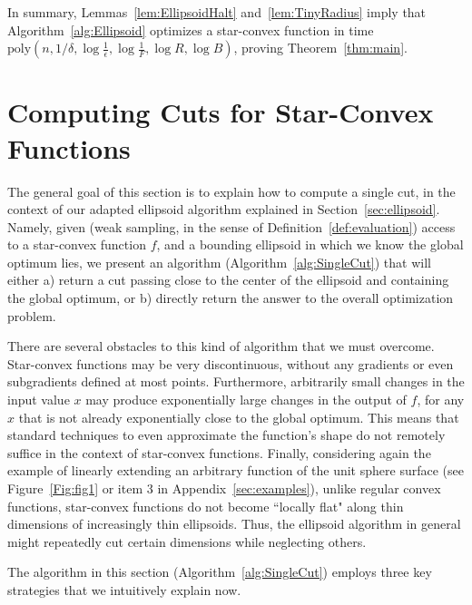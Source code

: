 \documentclass[11pt,letter]{article}
\renewcommand{\poly}{\mathrm{poly}}
\newcommand{\ferr}{\epsilon}
\newcommand{\perr}{\delta}
\numberwithin{nTheorems}{section}
\begin{document}
In summary, Lemmas~\ref{lem:EllipsoidHalt} and~\ref{lem:TinyRadius} imply that Algorithm~\ref{alg:Ellipsoid} optimizes a star-convex function in time $\poly(n,1/\perr,\log\frac{1}{\ferr},\log\frac{1}{F},\log R,\log B)$, proving Theorem~\ref{thm:main}.

\section{Computing Cuts for Star-Convex Functions}
\label{sec:cuts}

The general goal of this section is to explain how to compute a single cut, in the context of our adapted ellipsoid algorithm explained in Section~\ref{sec:ellipsoid}.
Namely, given (weak sampling, in the sense of Definition~\ref{def:evaluation}) access to a star-convex function $f$, and a bounding ellipsoid in which we know the global optimum lies, we present an algorithm (Algorithm~\ref{alg:SingleCut}) that will either a) return a cut passing close to the center of the ellipsoid and containing the global optimum, or b) directly return the answer to the overall optimization problem.

There are several obstacles to this kind of algorithm that we must overcome.
Star-convex functions may be very discontinuous, without any gradients or even subgradients defined at most points.
Furthermore, arbitrarily small changes in the input value $x$ may produce exponentially large changes in the output of $f$, for any $x$ that is not already exponentially close to the global optimum.
This means that standard techniques to even approximate the function's shape do not remotely suffice in the context of star-convex functions.
Finally, considering again the example of linearly extending an arbitrary function of the unit sphere surface (see Figure~\ref{Fig:fig1} or item 3 in Appendix~\ref{sec:examples}), unlike regular convex functions, star-convex functions do not become ``locally flat" along thin dimensions of increasingly thin ellipsoids.
Thus, the ellipsoid algorithm in general might repeatedly cut certain dimensions while neglecting others.

The algorithm in this section (Algorithm~\ref{alg:SingleCut}) employs three key strategies that we intuitively explain now.
\end{document}
